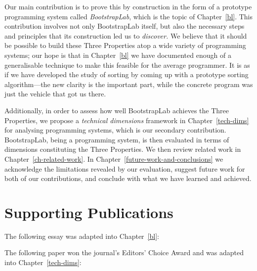 \documentclass[ twoside,openright,titlepage,numbers=noenddot,headinclude,footinclude,cleardoublepage=empty,abstract=on,
                BCOR=5mm,paper=a4,fontsize=11pt
                ]{scrreprt}
\theoremstyle{definition}
\begin{document}
Our main contribution is to prove this by construction in the form of a
prototype programming system called \emph{BootstrapLab}, which is the
topic of Chapter~\ref{bl}. This contribution involves not only
BootstrapLab itself, but also the necessary steps and principles that
its construction led us to \emph{discover.} We believe that it should be
possible to build these Three Properties atop a wide variety of
programming systems; our hope is that in Chapter~\ref{bl} we have
documented enough of a generalisable technique to make this feasible for
the average programmer. It is as if we have developed the study of
sorting by coming up with a prototype sorting algorithm---the new
clarity is the important part, while the concrete program was just the
vehicle that got us there.

Additionally, in order to assess how well BootstrapLab achieves the
Three Properties, we propose a \emph{technical dimensions} framework in
Chapter~\ref{tech-dims} for analysing programming systems, which is our
secondary contribution. BootstrapLab, being a programming system, is
then evaluated in terms of dimensions constituting the Three Properties.
We then review related work in Chapter~\ref{ch-related-work}. In
Chapter~\ref{future-work-and-conclusions} we acknowledge the limitations
revealed by our evaluation, suggest future work for both of our
contributions, and conclude with what we have learned and achieved.

\hypertarget{supporting-publications}{\section{Supporting Publications}\label{supporting-publications}}

The following essay was adapted into Chapter~\ref{bl}:

\begin{quote}
\end{quote}

The following paper won the journal's Editors' Choice Award and was
adapted into Chapter~\ref{tech-dims}:

\begin{quote}
\end{quote}
\end{document}
